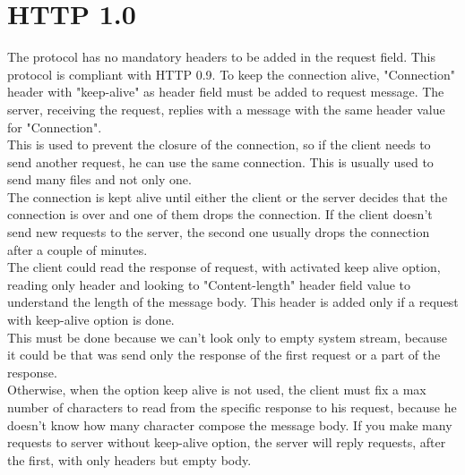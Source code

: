 \section{HTTP 1.0}
The protocol has no mandatory headers to be added in the request field. This protocol is compliant with HTTP 0.9.
To keep the connection alive, "Connection" header with "keep-alive" as header field must be added to request message. The server, receiving the request, replies with a message with the same header value for "Connection".\\
This is used to prevent the closure of the connection, so if the client needs to send another request, he can use the same connection.
This is usually used to send many files and not only one.\\
The connection is kept alive until either the client or the server decides that the connection is over and one of them drops the connection. If the client doesn't send new requests to the server, the second one usually drops the connection after a couple of minutes.\\
The client could read the response of request, with activated keep alive option, reading only header and looking to "Content-length" header field value to understand the length of the message body. This header is added only if a request with keep-alive option is done.\\
This must be done because we can't look only to empty system stream, because it could be that was send only the response of the first request or a part of the response.\\
Otherwise, when the option keep alive is not used, the client must fix a max number of characters to read from the specific response to his request, because he doesn't know how many character compose the message body. If you make many requests to server without keep-alive option, the server will reply requests, after the first, with only headers but empty body.\\

